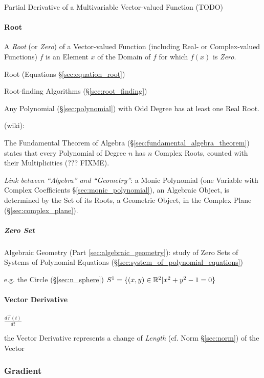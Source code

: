 Partial Derivative of a Multivariable Vector-valued Function (TODO)



\paragraph{Root}\label{sec:function_root}\hfill

A \emph{Root} (or \emph{Zero}) of a Vector-valued Function (including Real- or
Complex-valued Functions) $f$ is an Element $x$ of the Domain of $f$ for which
$f(x)$ is \emph{Zero}.

\fist Root (Equations \S\ref{sec:equation_root})

\fist Root-finding Algorithms (\S\ref{sec:root_finding})

Any Polynomial (\S\ref{sec:polynomial}) with Odd Degree has at least
one Real Root.

(wiki):

The Fundamental Theorem of Algebra (\S\ref{sec:fundamental_algebra_theorem})
states that every Polynomial of Degree $n$ has $n$ Complex Roots, counted with
their Multiplicities (??? FIXME).

\emph{Link between ``Algebra'' and ``Geometry''}: a Monic Polynomial (one
Variable with Complex Coefficients \S\ref{sec:monic_polynomial}), an Algebraic
Object, is determined by the Set of its Roots, a Geometric Object, in the
Complex Plane (\S\ref{sec:complex_plane}).



\subparagraph{Zero Set}\label{sec:zero_set}\hfill

\fist Algebraic Geometry (Part \ref{sec:algebraic_geometry}): study of Zero
Sets of Systems of Polynomial Equations
(\S\ref{sec:system_of_polynomial_equations})

e.g. the Circle (\S\ref{sec:n_sphere}) $S^1 = \{ (x,y) \in \mathbb{R}^2 | x^2 + y^2
- 1 = 0 \}$



\paragraph{Vector Derivative}\label{sec:vector_derivative}\hfill

$\frac{d\vec{r}(t)}{dt}$

the Vector Derivative represents a change of \emph{Length} (cf. Norm
\S\ref{sec:norm}) of the Vector



\subsubsection{Gradient}\label{sec:gradient}

